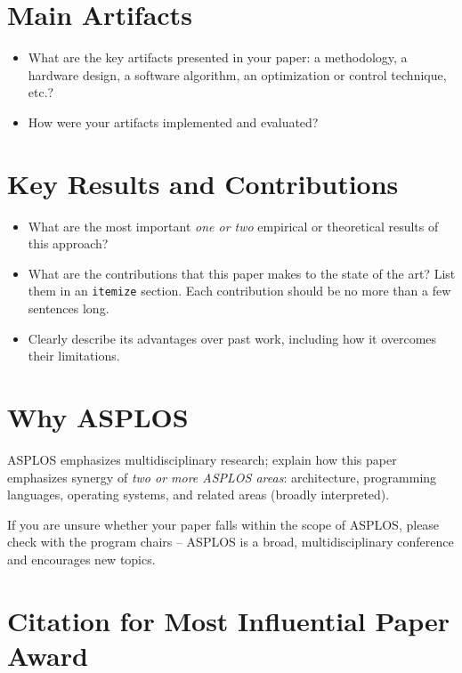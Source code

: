 \documentclass[pageno]{jpaper}
\begin{document}
\section{Main Artifacts}
\label{sec:main-artifacts}

\begin{itemize}
\item What are the key artifacts presented in your paper: a
  methodology, a hardware design, a software algorithm, an
  optimization or control technique, etc.?
  \item How were your artifacts implemented and evaluated? 
\end{itemize}

\section{Key Results and Contributions}
\label{sec:key-contributions}

\begin{itemize}
  \item What are the most important \emph{one or two} empirical or theoretical
    results of this approach?
  \item What are the contributions that this paper makes to the state of the
    art? List them in an \texttt{itemize} section. Each contribution should be no more than a few sentences long.
  \item Clearly describe its advantages over past work, including how it overcomes their limitations.
\end{itemize}


\section{Why ASPLOS}
\label{sec:why-asplos}

ASPLOS emphasizes multidisciplinary research; explain how this
  paper emphasizes synergy of \emph{two or more ASPLOS areas}: architecture,
  programming languages, operating systems, and related areas (broadly
  interpreted).

\noindent
If you are unsure whether your paper falls within the scope of ASPLOS,
please check with the program chairs -- ASPLOS is a broad,
multidisciplinary conference and encourages new topics.

\section{Citation for Most Influential Paper Award}
\label{sec:citation}
\end{document}
